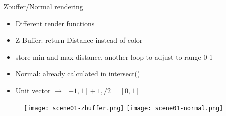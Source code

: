 \documentclass{beamer}
\begin{document}
\begin{frame}{Zbuffer/Normal rendering}

\begin{itemize}
  \item Different render functions
  \item Z Buffer: return Distance instead of color
  \item store min and max distance, another loop to adjust to range 0-1
  \item Normal: already calculated in intersect()
  \item Unit vector $\rightarrow [-1,1] +1, / 2 = [0,1]$
\end{itemize}

   \begin{figure}[ht]
       \texttt{[image: scene01-zbuffer.png]} %
       \texttt{[image: scene01-normal.png]} %
    \end{figure}

\end{frame}
\end{document}
